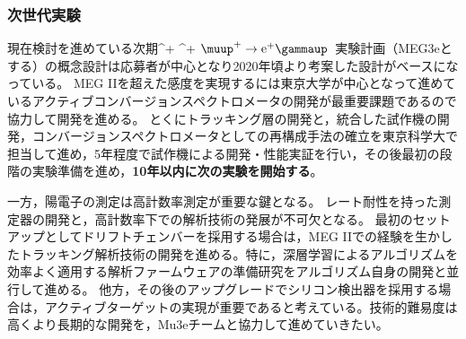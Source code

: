\documentclass[11pt,a4paper,uplatex,dvipdfmx]{ujarticle} 		%
\newcommand{\研究課題名}{象の卵}
\newcommand{\研究機関名}{東京大学}
\newcommand{\研究代表者氏名}{内山雄祐}
\newcommand{\研究期間の最終元号年度}{6}  %
\renewcommand{\emph}[1]{{\sffamily\bfseries{#1}}}
\newcommand*{\megc}{\ifmmode\muup^+ \to \mathrm{e}^+ \gammaup\else$\muup^+ \to \mathrm{e}^+ \gammaup$\fi}
\begin{document}
%
%


\subsubsection{次世代実験}
現在検討を進めている次期\megc\ 実験計画（MEG3eとする）の概念設計は応募者が中心となり2020年頃より考案した設計がベースになっている。
MEG IIを超えた感度を実現するには東京大学が中心となって進めているアクティブコンバージョンスペクトロメータの開発\cite{acps_2025}が最重要課題であるので協力して開発を進める。
とくにトラッキング層の開発と，統合した試作機の開発，コンバージョンスペクトロメータとしての再構成手法の確立を東京科学大で担当して進め，5年程度で試作機による開発・性能実証を行い，その後最初の段階の実験準備を進め，\emph{10年以内に次の実験を開始する}。

一方，陽電子の測定は高計数率測定が重要な鍵となる。
レート耐性を持った測定器の開発と，高計数率下での解析技術の発展が不可欠となる。
最初のセットアップとしてドリフトチェンバーを採用する場合は，MEG IIでの経験を生かしたトラッキング解析技術の開発を進める。特に，深層学習によるアルゴリズムを効率よく適用する解析ファームウェアの準備研究をアルゴリズム自身の開発と並行して進める。%
他方，その後のアップグレードでシリコン検出器を採用する場合は，アクティブターゲットの実現が重要であると考えている。技術的難易度は高くより長期的な開発を，Mu3eチームと協力して進めていきたい。
\end{document}
